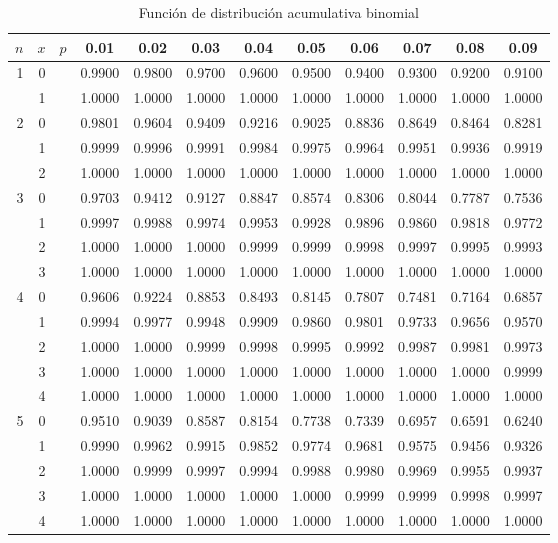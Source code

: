          \begin{table}[h!]
     \begin{center}
     
\begin{tabular}[t]{|r|r|cccccccccc|}

\hline
$n$ & $x$ &$p$ & 0.01 & 0.02 & 0.03 & 0.04 & 0.05 & 0.06 & 0.07 & 0.08 & 0.09 \\
\hline
\phantom{0}1 
& \phantom{0}0
   &&0.9900&0.9800&0.9700&0.9600&0.9500&0.9400&0.9300&0.9200&0.9100\\
& 1&&1.0000&1.0000&1.0000&1.0000&1.0000&1.0000&1.0000&1.0000&1.0000\\
2 
& 0&&0.9801&0.9604&0.9409&0.9216&0.9025&0.8836&0.8649&0.8464&0.8281\\
& 1&&0.9999&0.9996&0.9991&0.9984&0.9975&0.9964&0.9951&0.9936&0.9919\\
& 2&&1.0000&1.0000&1.0000&1.0000&1.0000&1.0000&1.0000&1.0000&1.0000\\
3 
& 0&&0.9703&0.9412&0.9127&0.8847&0.8574&0.8306&0.8044&0.7787&0.7536\\
& 1&&0.9997&0.9988&0.9974&0.9953&0.9928&0.9896&0.9860&0.9818&0.9772\\
& 2&&1.0000&1.0000&1.0000&0.9999&0.9999&0.9998&0.9997&0.9995&0.9993\\
& 3&&1.0000&1.0000&1.0000&1.0000&1.0000&1.0000&1.0000&1.0000&1.0000\\
4 
& 0&&0.9606&0.9224&0.8853&0.8493&0.8145&0.7807&0.7481&0.7164&0.6857\\
& 1&&0.9994&0.9977&0.9948&0.9909&0.9860&0.9801&0.9733&0.9656&0.9570\\
& 2&&1.0000&1.0000&0.9999&0.9998&0.9995&0.9992&0.9987&0.9981&0.9973\\
& 3&&1.0000&1.0000&1.0000&1.0000&1.0000&1.0000&1.0000&1.0000&0.9999\\
& 4&&1.0000&1.0000&1.0000&1.0000&1.0000&1.0000&1.0000&1.0000&1.0000\\
5 
& 0&&0.9510&0.9039&0.8587&0.8154&0.7738&0.7339&0.6957&0.6591&0.6240\\
& 1&&0.9990&0.9962&0.9915&0.9852&0.9774&0.9681&0.9575&0.9456&0.9326\\
& 2&&1.0000&0.9999&0.9997&0.9994&0.9988&0.9980&0.9969&0.9955&0.9937\\
& 3&&1.0000&1.0000&1.0000&1.0000&1.0000&0.9999&0.9999&0.9998&0.9997\\
& 4&&1.0000&1.0000&1.0000&1.0000&1.0000&1.0000&1.0000&1.0000&1.0000\\
\hline
\end{tabular}
    \end{center}
    \caption{
Función de distribución acumulativa binomial}
    \end{table}
    
